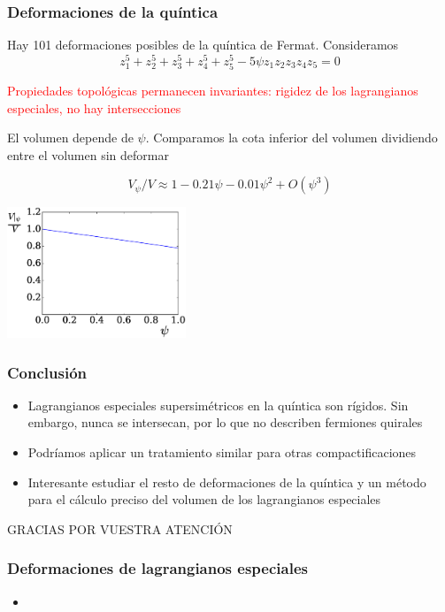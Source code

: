 \documentclass{beamer}
\begin{document}
\begin{frame}
  \frametitle{Deformaciones de la quíntica}
  \begin{itemize}
    \item Hay 101 deformaciones posibles de la quíntica de Fermat. 
      Consideramos
      \begin{equation*}
        z_1^5+z_2^5+z_3^5+z_4^5+z_5^5-5\psi z_1z_2z_3z_4z_5=0 
      \end{equation*}
      \textcolor{red}{
    \item Propiedades topológicas permanecen invariantes: rigidez de los lagrangianos especiales, no hay intersecciones}
    \textcolor{ao}{
    \item El volumen depende de $\psi$. Comparamos la cota inferior del volumen dividiendo entre el volumen sin deformar}
      \begin{equation*}
        V_\psi/V \approx 1 - 0.21\psi -0.01\psi^2+O(\psi^3)
      \end{equation*}
      \begin{center}
      \includegraphics[width=0.4\textwidth]{graph.eps}
      \end{center}
  \end{itemize}
\end{frame}

\begin{frame}
  \frametitle{Conclusión}
  \begin{itemize}
    \item Lagrangianos especiales supersimétricos en la quíntica son rígidos.
      Sin embargo, nunca se intersecan, por lo que no describen fermiones quirales
    \item  Podríamos aplicar un tratamiento similar para otras compactificaciones
    \item Interesante estudiar el resto de deformaciones de la quíntica y un método para el cálculo preciso 
      del volumen de los lagrangianos especiales
  \end{itemize}
\end{frame}

\begin{frame}
  \begin{center}
  \Large{GRACIAS POR VUESTRA ATENCIÓN}
  \end{center}
\end{frame}

\begin{frame}
  \frametitle{Deformaciones de lagrangianos especiales}
  \begin{itemize}
    \item 
  \end{itemize}
\end{frame}
\end{document}
